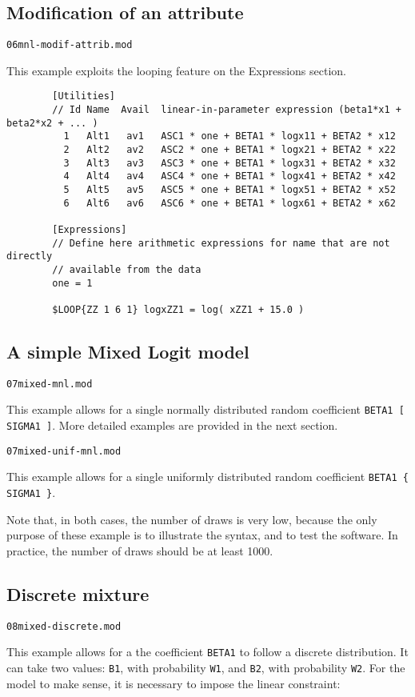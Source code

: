 \documentclass[12pt]{memoir}
\begin{document}
\subsection{Modification of an attribute}
\begin{flushright}
\verb+06mnl-modif-attrib.mod+
\end{flushright}
This example exploits the looping feature on the Expressions section.

\footnotesize
{\footnotesize
\begin{verbatim}
        [Utilities]
        // Id Name  Avail  linear-in-parameter expression (beta1*x1 + beta2*x2 + ... )
          1   Alt1   av1   ASC1 * one + BETA1 * logx11 + BETA2 * x12
          2   Alt2   av2   ASC2 * one + BETA1 * logx21 + BETA2 * x22
          3   Alt3   av3   ASC3 * one + BETA1 * logx31 + BETA2 * x32
          4   Alt4   av4   ASC4 * one + BETA1 * logx41 + BETA2 * x42
          5   Alt5   av5   ASC5 * one + BETA1 * logx51 + BETA2 * x52
          6   Alt6   av6   ASC6 * one + BETA1 * logx61 + BETA2 * x62

        [Expressions] 
        // Define here arithmetic expressions for name that are not directly 
        // available from the data
        one = 1

        $LOOP{ZZ 1 6 1} logxZZ1 = log( xZZ1 + 15.0 )
\end{verbatim}
}
\normalsize

\subsection{A simple Mixed Logit model}
\begin{flushright}
\verb+07mixed-mnl.mod+
\end{flushright}
This example allows for a single normally distributed random
coefficient \verb+BETA1 [ SIGMA1 ]+.  More detailed
examples are provided in the next section.
\begin{flushright}
\verb+07mixed-unif-mnl.mod+
\end{flushright}
This example allows for a single uniformly distributed random
coefficient \verb+BETA1 { SIGMA1 }+.


Note that, in both cases, the number of draws is very low, because the only purpose of these example is to illustrate the syntax, and to test the software. In practice, the number of draws should be at least 1000.

\subsection{Discrete mixture}
\begin{flushright}
\verb+08mixed-discrete.mod+
\end{flushright}
This example allows for a the coefficient \verb+BETA1+ to follow a discrete distribution. It can take two values: \verb+B1+, with probability \verb+W1+, and \verb+B2+, with probability \verb+W2+. For the model to make sense, it is necessary to impose the linear constraint:
\end{document}
